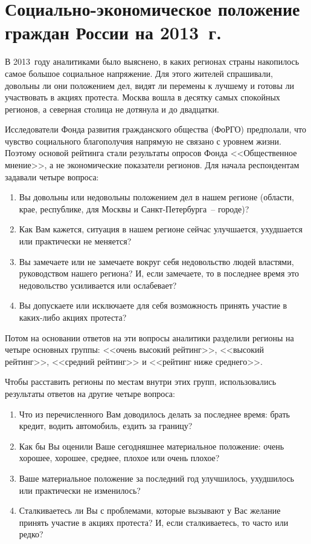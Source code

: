   \section{Социально-экономическое положение граждан России на 2013~г.}

  В 2013~году аналитиками было выяснено, в каких регионах страны накопилось
  самое большое социальное напряжение. Для этого жителей спрашивали, довольны
  ли они положением дел, видят ли перемены к лучшему и готовы ли участвовать в
  акциях протеста. Москва вошла в десятку самых спокойных регионов, а северная
  столица не дотянула и до двадцатки.

  Исследователи Фонда развития гражданского общества (ФоРГО) предполали, что
  чувство социального благополучия напрямую не связано с уровнем жизни. Поэтому
  основой рейтинга стали результаты опросов Фонда <<Общественное мнение>>, а не
  экономические показатели регионов. Для начала респондентам задавали четыре
  вопроса:
  \begin{enumerate}
    \item Вы довольны или недовольны положением дел в нашем регионе
      (области, крае, республике, для Москвы и Санкт-Петербурга~-- городе)?
    \item Как Вам кажется, ситуация в нашем регионе сейчас улучшается,
      ухудшается или практически не меняется?
    \item Вы замечаете или не замечаете вокруг себя недовольство людей
      властями, руководством нашего региона? И, если замечаете, то в последнее
      время это недовольство усиливается или ослабевает?
    \item Вы допускаете или исключаете для себя возможность принять участие в
      каких-либо акциях протеста?
  \end{enumerate}
  Потом на основании ответов на эти вопросы аналитики разделили регионы на
  четыре основных группы: <<очень высокий рейтинг>>, <<высокий рейтинг>>,
  <<средний рейтинг>> и <<рейтинг ниже среднего>>.

  Чтобы расставить регионы по местам внутри этих групп, использовались
  результаты ответов на другие четыре вопроса:
  \begin{enumerate}
    \item Что из перечисленного Вам доводилось делать за последнее время: брать
      кредит, водить автомобиль, ездить за границу?
    \item Как бы Вы оценили Ваше сегодняшнее материальное положение: очень
      хорошее, хорошее, среднее, плохое или очень плохое?
    \item Ваше материальное положение за последний год улучшилось, ухудшилось
      или практически не изменилось?
    \item Сталкиваетесь ли Вы с проблемами, которые вызывают у Вас желание
      принять участие в акциях протеста? И, если сталкиваетесь, то часто или
      редко?
  \end{enumerate}

